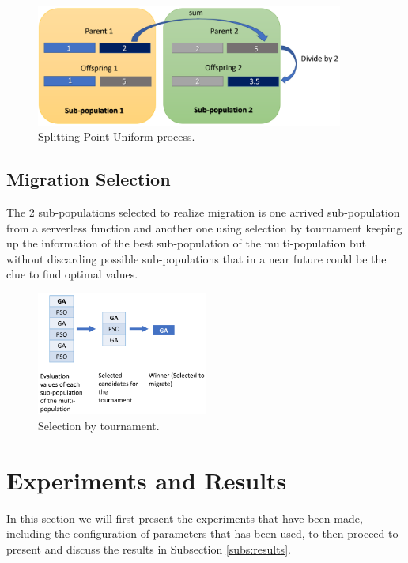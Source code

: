 \documentclass[runningheads]{llncs}
\begin{document}
\begin{figure}[htp]
  \centering
  \includegraphics[width=0.9\textwidth]{img/splittinPointUniform.png}
  \caption{Splitting Point Uniform process.} \label{fig4}
  \end{figure}

  \subsection{Migration Selection} The 2 sub-populations selected to realize
  migration is one arrived sub-population from a serverless function and another
  one using selection by tournament keeping up the information of the best
  sub-population of the multi-population but without discarding possible
  sub-populations that in a near future could be the clue to find optimal
  values.

\begin{figure}[htp]
  \centering
  \includegraphics[width=0.5\textwidth]{img/selection.png}
  \caption{Selection by tournament.} \label{fig5}
  \end{figure}


  \section{Experiments and Results}
  \label{sec:exp}

  In this section we will first present the experiments that have been
  made, including the configuration of parameters that has been used,
  to then proceed to present and discuss the results in Subsection
  \ref{subs:results}. 
    
\end{document}
